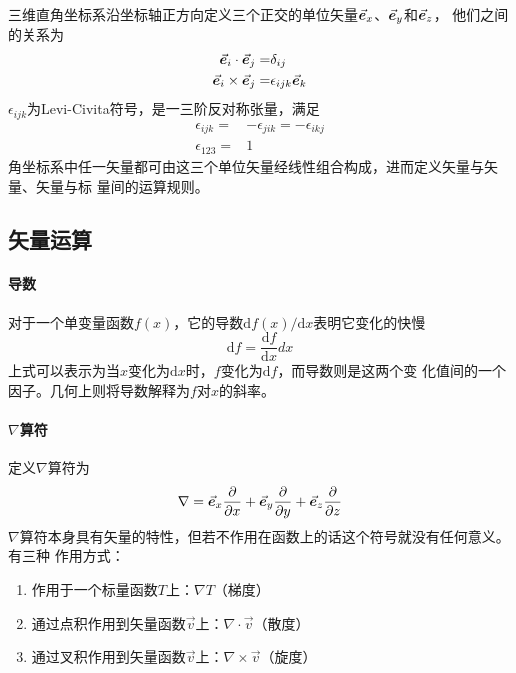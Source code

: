 三维直角坐标系沿坐标轴正方向定义三个正交的单位矢量$\vec{\bm{e}}_x$、$\vec{\bm{e}}_y$和$\vec{\bm{e}}_z$，
他们之间的关系为
\begin{equation}
    \begin{aligned}
        \vec{\bm{e}}_{i} \cdot  \vec{\bm{e}}_{j} =& \delta_{ij} \\
        \vec{\bm{e}}_{i} \times \vec{\bm{e}}_{j} =& \epsilon_{ijk} \vec{\bm{e}}_{k}
    \end{aligned}
    \label{eq:vec-cartesian}
\end{equation}
$\epsilon_{ijk}$为Levi-Civita符号，是一三阶反对称张量，满足
\begin{equation}
    \begin{aligned}
        \epsilon_{ijk} =& - \epsilon_{jik} = -\epsilon_{ikj} \\
        \epsilon_{123} =& 1
    \end{aligned}
    \label{eq:Levi-Civita}
\end{equation}
角坐标系中任一矢量都可由这三个单位矢量经线性组合构成，进而定义矢量与矢量、矢量与标
量间的运算规则。

\subsection{矢量运算}
\paragraph*{导数}
对于一个单变量函数$f(x)$，它的导数$\mathrm{d} f(x)/ \mathrm{d} x$表明它变化的快慢
\begin{equation}
    \mathrm{d} f = \frac{\mathrm{d} f}{\mathrm{d} x} dx
                                \label{eq:vec-derivative}
\end{equation}
上式可以表示为当$x$变化为$\mathrm{d}x$时，$f$变化为$\mathrm{d}f$，而导数则是这两个变
化值间的一个因子。几何上则将导数解释为$f$对$x$的斜率。

\paragraph*{$\nabla$算符}
定义$\nabla$算符为
\begin{equation}
    \nabla =    \vec{\bm{e}}_x \frac{\partial}{\partial x} 
               +\vec{\bm{e}}_y \frac{\partial}{\partial y}
               +\vec{\bm{e}}_z \frac{\partial}{\partial z}
    \label{eq:nabla-operator}
\end{equation}
$\nabla$算符本身具有矢量的特性，但若不作用在函数上的话这个符号就没有任何意义。有三种
作用方式：
\begin{enumerate}
    \item 作用于一个标量函数$T$上：$\nabla T$（梯度）
    \item 通过点积作用到矢量函数$\vec{v}$上：$\nabla \cdot \vec{v}$（散度）
    \item 通过叉积作用到矢量函数$\vec{v}$上：$\nabla \times \vec{v}$（旋度）
\end{enumerate}

